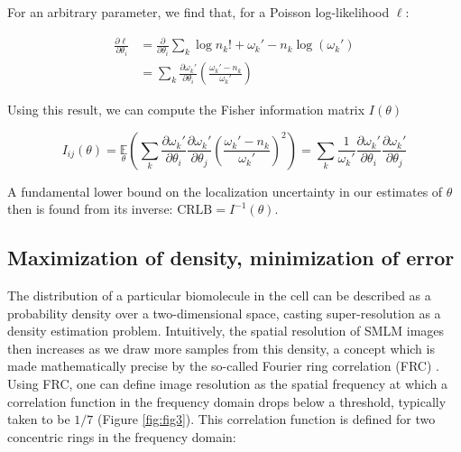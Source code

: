 For an arbitrary parameter, we find that, for a Poisson log-likelihood $\ell$:

\begin{align*}
\frac{\partial \ell}{\partial \theta_{i}} &= \frac{\partial}{\partial \theta_{i}} \sum_{k}  \log n_{k}! + \omega_{k}' - n_{k}\log\left(\omega_{k}'\right)\\
&= \sum_{k} \frac{\partial \omega_{k}'}{\partial\theta_{i}} \left(\frac{\omega_{k}'-n_{k}}{\omega_{k}'}\right)
\end{align*}

Using this result, we can compute the Fisher information matrix $I(\theta)$

\begin{equation}
I_{ij}(\theta) = \underset{\theta}{\mathbb{E}}\left(\sum_{k}\frac{\partial \omega_{k}'}{\partial\theta_{i}}\frac{\partial \omega_{k}'}{\partial\theta_{j}} \left(\frac{\omega_{k}'-n_{k}}{\omega_{k}'}\right)^{2}\right) = \sum_{k}\frac{1}{\omega_{k}'}\frac{\partial \omega_{k}'}{\partial\theta_{i}}\frac{\partial \omega_{k}'}{\partial\theta_{j}}
\end{equation}

A fundamental lower bound on the localization uncertainty in our estimates of $\theta$ then is found from its inverse: $\mathrm{CRLB} = I^{-1}(\theta)$.

\subsection{Maximization of density, minimization of error}


The distribution of a particular biomolecule in the cell can be described as a probability density over a two-dimensional space, casting super-resolution as a density estimation problem. Intuitively, the spatial resolution of SMLM images then increases as we draw more samples from this density, a concept which is made mathematically precise by the so-called Fourier ring correlation (FRC) \parencite{Nieuwenhuizen2013}. Using FRC, one can define image resolution as the spatial frequency at which a correlation function in the frequency domain drops below a threshold, typically taken to be $1/7$  (Figure \ref{fig:fig3}). This correlation function is defined for two concentric rings in the frequency domain:

